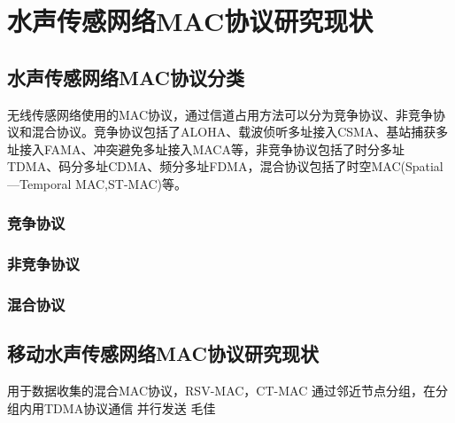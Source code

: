 \chapter{水声传感网络MAC协议研究现状 }
\section{水声传感网络MAC协议分类 }
无线传感网络使用的MAC协议，通过信道占用方法可以分为竞争协议、非竞争协议和混合协议。竞争协议包括了ALOHA、载波侦听多址接入CSMA、基站捕获多址接入FAMA、冲突避免多址接入MACA等，非竞争协议包括了时分多址TDMA、码分多址CDMA、频分多址FDMA，混合协议包括了时空MAC(Spatial—Temporal MAC,ST-MAC)等。
\subsection{竞争协议}
\subsection{非竞争协议}
\subsection{混合协议}
\section{移动水声传感网络MAC协议研究现状}
用于数据收集的混合MAC协议，RSV-MAC，CT-MAC\cite{A Hybrid MAC Protocol in Data-collection-oriented
Underwater Acoustic Sensor Networks}
通过邻近节点分组，在分组内用TDMA协议通信\cite{Multi-Cluster Protocol for Ad Hoc Mobile Underwater Acoustic Networks Oceans2003}
并行发送\cite{DOTS: A Propagation Delay-Aware Opportunistic MAC Protocol for Mobile Underwater Networks} 毛佳\cite{LTM-MAC: A location-based TDMA MAC protocol for mobile underwater networks}

\endinput